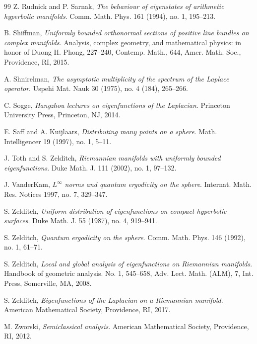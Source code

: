 \documentclass[12pt,reqno]{amsart}
\theoremstyle{plain}
\theoremstyle{definition}
\theoremstyle{remark}
\numberwithin{equation}{section}
\begin{document}
\begin{thebibliography}{99}
 Z. Rudnick and P. Sarnak, 
\textit{The behaviour of eigenstates of arithmetic hyperbolic manifolds}. Comm. Math. Phys. 161 (1994), no. 1, 195--213.

 B. Shiffman, 
\textit{Uniformly bounded orthonormal sections of positive line bundles on complex manifolds}. Analysis, complex geometry, and mathematical physics: in honor of Duong H. Phong, 227--240, Contemp. Math., 644, Amer. Math. Soc., Providence, RI, 2015.

 A. Shnirelman,
\textit{The asymptotic multiplicity of the spectrum of the Laplace operator}. Uspehi Mat. Nauk 30 (1975), no. 4 (184), 265--266.

 C. Sogge,
\textit{Hangzhou lectures on eigenfunctions of the Laplacian}. Princeton University Press, Princeton, NJ, 2014.

 E. Saff and A. Kuijlaars,
\textit{Distributing many points on a sphere}. Math. Intelligencer 19 (1997), no. 1, 5--11.

 J. Toth and S. Zelditch,
\textit{Riemannian manifolds with uniformly bounded eigenfunctions}. Duke Math. J. 111 (2002), no. 1, 97--132.

 J. VanderKam, 
\textit{$L^\infty$ norms and quantum ergodicity on the sphere}. Internat. Math. Res. Notices 1997, no. 7, 329--347. 

 S. Zelditch,
\textit{Uniform distribution of eigenfunctions on compact hyperbolic surfaces}. Duke Math. J. 55 (1987), no. 4, 919--941.

 S. Zelditch,
\textit{Quantum ergodicity on the sphere}. Comm. Math. Phys. 146 (1992), no. 1, 61--71.

 S. Zelditch, 
\textit{Local and global analysis of eigenfunctions on Riemannian manifolds}. Handbook of geometric analysis. No. 1, 545--658, Adv. Lect. Math. (ALM), 7, Int. Press, Somerville, MA, 2008.

 S. Zelditch, 
\textit{Eigenfunctions of the Laplacian on a Riemannian manifold}. American Mathematical Society, Providence, RI, 2017.

 M. Zworski,
\textit{Semiclassical analysis}. American Mathematical Society, Providence, RI, 2012.
\end{thebibliography}
\end{document}
